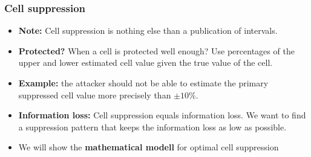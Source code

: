 \begin{frame}\frametitle{Cell suppression}
	\begin{itemize}
		\item {\bf Note:} Cell suppression is nothing else than a publication of intervals.\pause
		\item {\bf Protected?} When a cell is protected well enough? Use percentages of the upper and lower estimated cell value given the true value of the cell. \pause
		\item {\bf Example:} the attacker should not be able to estimate the primary suppressed cell value more precisely than $\pm 10\%$. \pause
		\item {\bf Information loss:} Cell suppression equals information loss. We want to find a suppression pattern that keeps the information loss as low as possible.\pause
		\item We will show the \textbf{mathematical modell} for optimal cell suppression
		\end{itemize}
\end{frame}


